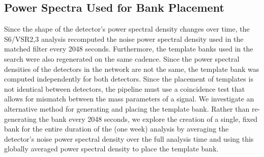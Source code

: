 \documentclass[12pt]{iopart} \usepackage{graphicx,amssymb}
\begin{document}
\subsection{Power Spectra Used for Bank Placement}
\label{s:fixed}

Since the shape of the detector's power spectral density changes over time,
the S6/VSR2,3 analysis recomputed the noise power spectral density used in the
matched filter every 2048 seconds. Furthermore, the template banks used in the
search were also regenerated on the same cadence. Since the power spectral
densities of the detectors in the network are not the same, the template bank
was computed independently for both detectors. Since the placement of
templates is not identical between detectors, the pipeline must use a
coincidence test that allows for mismatch between the mass parameters of a
signal. We investigate an alternative method for generating and placing
the template bank. Rather than re-generating the bank every 2048 seconds, we
explore the creation of a single, fixed bank for the entire duration of the
(one week) analysis by averaging the detector's noise power spectral density over the full
analysis time and using this globally averaged power spectral density to place the template bank.
\end{document}
